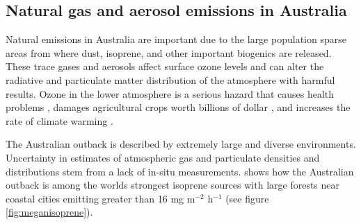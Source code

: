 \subsection{Natural gas and aerosol emissions in Australia}
Natural emissions in Australia are important due to the large population sparse areas from where dust, isoprene, and other important biogenics are released.
These trace gases and aerosols affect surface ozone levels and can alter the radiative and particulate matter distribution of the atmosphere with harmful results.
Ozone in the lower atmosphere is a serious hazard that causes health problems \cite{Hsieh_2013}, damages agricultural crops worth billions of dollar \cite{Avnery_2011}, and increases the rate of climate warming \cite{IPCC_2013_chap8}. 

The Australian outback is described by extremely large and diverse environments. 
Uncertainty in estimates of atmospheric gas and particulate densities and distributions stem from a lack of in-situ measurements.
\citet{Guenther_2006} shows how the Australian outback is among the worlds strongest isoprene sources with large forests near coastal cities emitting greater than 16 mg m$^{-2}$ h$^{-1}$ (see figure \ref{fig:meganisoprene}).

  